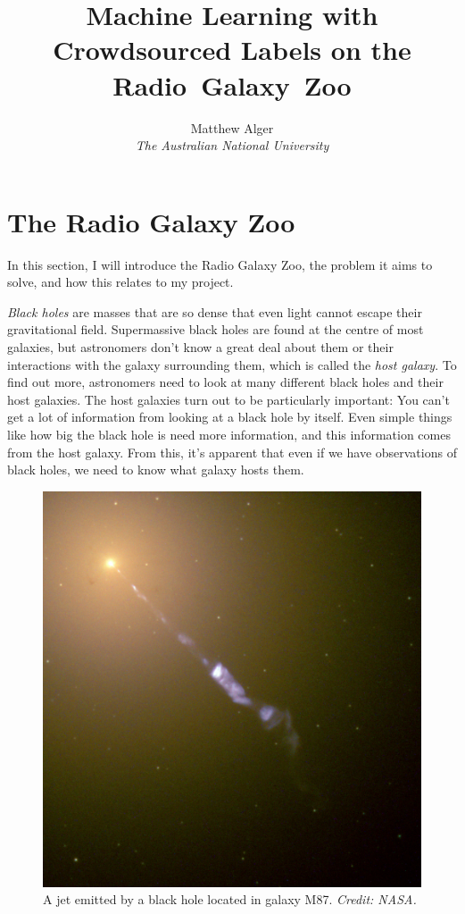 \documentclass[a4paper]{article}
\begin{document}
    \title{Machine Learning with Crowdsourced Labels on the Radio~Galaxy~Zoo}
    \author{Matthew Alger \\ \emph{The Australian National University}}
    \maketitle

    \section{The Radio Galaxy Zoo}

        In this section, I will introduce the Radio Galaxy Zoo, the problem it aims to solve, and how this relates to my project.

        \emph{Black holes} are masses that are so dense that even light cannot escape their gravitational field. Supermassive black holes are found at the centre of most galaxies, but astronomers don't know a great deal about them or their interactions with the galaxy surrounding them, which is called the \emph{host galaxy}. To find out more, astronomers need to look at many different black holes and their host galaxies. The host galaxies turn out to be particularly important: You can't get a lot of information from looking at a black hole by itself. Even simple things like how big the black hole is need more information, and this information comes from the host galaxy. From this, it's apparent that even if we have observations of black holes, we need to know what galaxy hosts them.

        \begin{figure}[!ht]
            \center
            \includegraphics[width=.3\textwidth]{images/M87_jet.jpg}
            \caption{A jet emitted by a black hole located in galaxy M87. \emph{Credit: NASA.}}
            \label{fig-jet}
        \end{figure}
\end{document}
